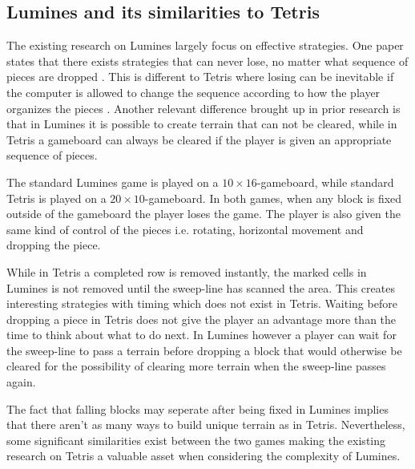 \subsection{Lumines and its similarities to Tetris}
\label{subsub:sim}

The existing research on Lumines largely focus on effective strategies. One paper states that there exists strategies that can never lose, no matter what sequence of pieces are dropped \cite{lumines}. This is different to Tetris where losing can be inevitable if the computer is allowed to change the sequence according to how the player organizes the pieces \cite[p. 4]{tetris}. Another relevant difference brought up in prior research is that in Lumines it is possible to create terrain that can not be cleared, while in Tetris a gameboard can always be cleared if the player is given an appropriate sequence of pieces.

The standard Lumines game is played on a $10 \times 16$-gameboard, while standard Tetris is played on a $20 \times 10$-gameboard. In both games, when any block is fixed outside of the gameboard the player loses the game. The player is also given the same kind of control of the pieces i.e. rotating, horizontal movement and dropping the piece.

While in Tetris a completed row is removed instantly, the marked cells in Lumines is not removed until the sweep-line has scanned the area. This creates interesting strategies with timing which does not exist in Tetris. Waiting before dropping a piece in Tetris does not give the player an advantage more than the time to think about what to do next. In Lumines however a player can wait for the sweep-line to pass a terrain before dropping a block that would otherwise be cleared for the possibility of clearing more terrain when the sweep-line passes again.

The fact that falling blocks may seperate after being fixed in Lumines implies that there aren't as many ways to build unique terrain as in Tetris. Nevertheless, some significant similarities exist between the two games making the existing research on Tetris a valuable asset when considering the complexity of Lumines.
